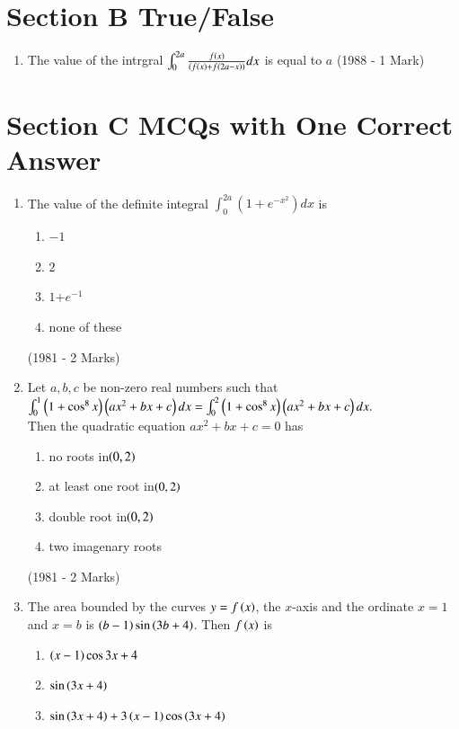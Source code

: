 \documentclass[journal,12pt,twocolumn]{IEEEtran}
\theoremstyle{remark}
\begin{document}
\section{Section B True/False}
\begin{enumerate}
	\item The value of the intrgral $\int_0^{2a} \frac{f(x)}{\left(f\left(x\right)+f\left(2a-x\right)\right)}dx$ is equal to $a$
\hfill{(1988 - 1 Mark)}\\
\end{enumerate}
\section{Section C MCQs with One Correct Answer}
\begin{enumerate}
	\item The value of the definite integral $\int_0^{2a}(1+e^{-x^2})dx$ is\\
		\begin{enumerate}
	\item $-1$            
	\item  $2$
	\item  $1$+$e^{-1}$    
	\item  none of these
		\end{enumerate}
		\hfill{(1981 - 2 Marks)}
	\item Let $a,b,c$ be non-zero real numbers such that $\int_0^1 \left(1+ \cos ^8 x\right) \left(ax^2 + bx +c\right) dx = \int_0^2 \left( 1+ \cos^8 x \right) \left(ax^2+bx+c\right) dx.$\\
		Then the quadratic equation $ax^2+bx+c=0$ has
			\begin{enumerate}
			\item no roots in$ \left(0,2\right)$
			\item at least one root in$ \left(0,2\right)$
			\item double root in$ \left(0,2\right)  $
	\item two imagenary roots
                        \end{enumerate}
		\hfill{(1981 - 2 Marks)}
	\item The area bounded by the curves $y=f\left(x\right)$, the $x$-axis and the ordinate $x=1$ and $x=b$ is $\left(b-1\right) \sin \left(3b+4\right)$. Then $f\left(x\right)$ is 
	                \begin{enumerate}
			\item$\left(x-1\right) \cos {3x+4}$
			\item$\sin {\ensuremath{\left(3x+4\right)}}$
			\item$\sin {\ensuremath{\left(3x+4\right)}+3\ensuremath{\left(x-1\right)} \cos {\ensuremath{\left(3x+4\right)}}}$

\end{enumerate}
\end{enumerate}
\end{document}
